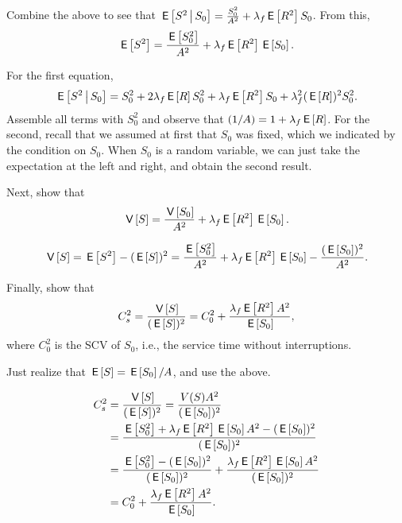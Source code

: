 \begin{exercise}[\faCalculator]
  Combine the above to see that
    $\E{S^2\given S_0} = \frac{S_0^2}{A^2} + \lambda_f \E{R^2} S_0$. From this, 
  \begin{equation*}
    \E{S^2} = \frac{\E{S_0^2}}{A^2} + \lambda_f \E{R^2} \E{S_0}.
  \end{equation*}
  \begin{solution}
For the first equation,
\begin{equation*}
  \E{S^2\given S_0} = S_0^2 + 2\lambda_f \E R S_0^2 + \lambda_f \E{R^2} S_0 + \lambda_f^2 (\E R)^2 S_0^2.
\end{equation*}
Assemble all terms with $S_0^2$ and observe that $(1/A) = 1+\lambda_f \E R$. For the second, recall that we assumed at first that $S_0$ was fixed, which we indicated by the condition on $S_0$. When $S_0$ is a random variable, we can just take the expectation at the left and right, and obtain the second result. 
  \end{solution}
\end{exercise}

\begin{exercise}[\faFlask]
Next, show that  
  \begin{equation*}
    \V{S} = \frac{\V{S_0}}{A^2} + \lambda_f \E{R^2} \E{S_0}.
  \end{equation*}
  \begin{solution}
    \begin{equation*}
    \V{S} = \E{S^2} - (\E S)^2 = 
\frac{\E{S_0^2}}{A^2} + \lambda_f \E{R^2} \E{S_0} -\frac{(\E{S_0})^2}{A^2}.
    \end{equation*}
  \end{solution}
\end{exercise}

\begin{exercise}[\faCalculator]
  Finally, show that
  \begin{equation*}
    C_s^2 = \frac{\V{S}}{(\E S)^2} = C_0^2 + \frac{\lambda_f \E{R^2} A^2}{\E{S_0}},
  \end{equation*}
where $C_0^2$ is the SCV of $S_0$, i.e., the service time without interruptions. 
\begin{hint} Just realize that $\E{S} = \E{S_0}/A$, and use the above.
\end{hint}
\begin{solution}
  \begin{align*}
C_s^2 &= \frac{\V{S}}{(\E S)^2} =\frac{V(S) A^2}{(\E{S_0})^2} \\
&=\frac{\E{S_0^2} + \lambda_f \E{R^2} \E{S_0}A^2 -(\E{S_0})^2}{(\E{S_0})^2} \\
&=\frac{\E{S_0^2} -(\E{S_0})^2}{(\E{S_0})^2} + \frac{\lambda_f \E{R^2} \E{S_0}A^2}{(\E{S_0})^2} \\
&=C_0^2 + \frac{\lambda_f \E{R^2}A^2}{\E{S_0}}.
  \end{align*}
\end{solution}
\end{exercise}

